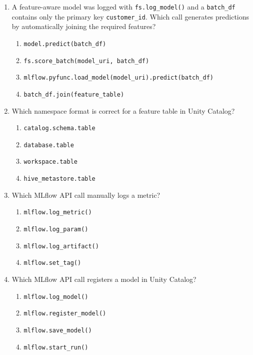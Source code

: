 \documentclass[11pt]{article}
\begin{document}
\begin{enumerate}[leftmargin=*, label=\textbf{Q\arabic*.}]
		\item A feature-aware model was logged with \texttt{fs.log\_model()} and a \texttt{batch\_df} contains only the primary key \texttt{customer\_id}. Which call generates predictions by automatically joining the required features?
		\begin{enumerate}[label=(\alph*)]
			\item \texttt{model.predict(batch\_df)}
			\item \texttt{fs.score\_batch(model\_uri, batch\_df)}
			\item \texttt{mlflow.pyfunc.load\_model(model\_uri).predict(batch\_df)}
			\item \texttt{batch\_df.join(feature\_table)}
		\end{enumerate}
		
		\item Which namespace format is correct for a feature table in Unity Catalog?
		\begin{enumerate}[label=(\alph*)]
			\item \texttt{catalog.schema.table}
			\item \texttt{database.table}
			\item \texttt{workspace.table}
			\item \texttt{hive\_metastore.table}
		\end{enumerate}
		
		\item Which MLflow API call manually logs a metric?
		\begin{enumerate}[label=(\alph*)]
			\item \texttt{mlflow.log\_metric()}
			\item \texttt{mlflow.log\_param()}
			\item \texttt{mlflow.log\_artifact()}
			\item \texttt{mlflow.set\_tag()}
		\end{enumerate}
		
		\item Which MLflow API call registers a model in Unity Catalog?
		\begin{enumerate}[label=(\alph*)]
			\item \texttt{mlflow.log\_model()}
			\item \texttt{mlflow.register\_model()}
			\item \texttt{mlflow.save\_model()}
			\item \texttt{mlflow.start\_run()}
		\end{enumerate}
		

\end{enumerate}
\end{document}
